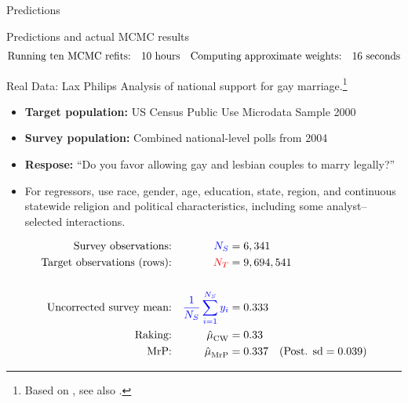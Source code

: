 \begin{frame}[t]{Predictions}
    \AlexanderPredictionFigOne{}
\end{frame}


\begin{frame}[t]{Predictions and actual MCMC results}
    \AlexanderPredictionFigTwo{}
    \vspace{-3em}
    $$
    \begin{aligned}
        \textrm{Running ten MCMC refits:}\quad & 10 \textrm{ hours} &
        \textrm{Computing approximate weights:}\quad &16 \textrm{ seconds}\\
    \end{aligned}
    $$
\end{frame}



\begin{frame}{Real Data: Lax Philips}
Analysis of national support for gay marriage.\footnote{Based on \textcite{kastellec:2010:laxmrp},
see also \textcite{lax:2009:gay}.}

\begin{itemize}
    \item \textbf{Target population:} US Census Public Use Microdata Sample 2000
    \item \textbf{Survey population:} Combined national-level polls from 2004
    \item \textbf{Respose:}  ``Do you favor allowing gay and lesbian couples to marry legally?''
    \item For regressors, use race, gender, age, education, state, region,
        and continuous statewide religion and political characteristics, including
        some analyst--selected interactions.
\end{itemize}

$$
\begin{aligned}
    \textrm{Survey observations:} &&  \textcolor{blue}{{N_S}} ={}& 6,341  \\
    \textrm{Target observations (rows):} &&  \textcolor{red}{{N_T}} ={}& 9,694,541 \\
    \\
    \textrm{Uncorrected survey mean:} && \textcolor{blue}{\frac{1}{{N_S}} \sum_{i=1}^{N_S} y_i} ={}& 0.333 \\
    \textrm{Raking:} && \hat{\mu}^{}_{\mathrm{CW}} ={}& 0.33 \\
    \textrm{MrP:} && \hat{\mu}^{}_{\mathrm{MrP}} ={}& 0.337
        \quad(\textrm{Post. sd} = 0.039)\\
\end{aligned}
$$
%
\end{frame}



